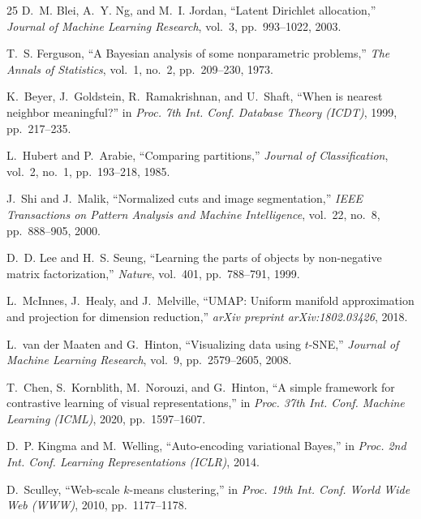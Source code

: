 \documentclass[conference]{IEEEtran}
\begin{document}
\begin{thebibliography}{25}
D.~M. Blei, A.~Y. Ng, and M.~I. Jordan,
``Latent Dirichlet allocation,''
\textit{Journal of Machine Learning Research}, vol.~3, pp.~993--1022, 2003.

T.~S. Ferguson,
``A Bayesian analysis of some nonparametric problems,''
\textit{The Annals of Statistics}, vol.~1, no.~2, pp.~209--230, 1973.

K.~Beyer, J.~Goldstein, R.~Ramakrishnan, and U.~Shaft,
``When is nearest neighbor meaningful?''
in \textit{Proc. 7th Int. Conf. Database Theory (ICDT)}, 1999, pp.~217--235.

L.~Hubert and P.~Arabie,
``Comparing partitions,''
\textit{Journal of Classification}, vol.~2, no.~1, pp.~193--218, 1985.

J.~Shi and J.~Malik,
``Normalized cuts and image segmentation,''
\textit{IEEE Transactions on Pattern Analysis and Machine Intelligence}, vol.~22, no.~8, pp.~888--905, 2000.

D.~D. Lee and H.~S. Seung,
``Learning the parts of objects by non-negative matrix factorization,''
\textit{Nature}, vol.~401, pp.~788--791, 1999.

L.~McInnes, J.~Healy, and J.~Melville,
``UMAP: Uniform manifold approximation and projection for dimension reduction,''
\textit{arXiv preprint arXiv:1802.03426}, 2018.

L.~van der Maaten and G.~Hinton,
``Visualizing data using $t$-SNE,''
\textit{Journal of Machine Learning Research}, vol.~9, pp.~2579--2605, 2008.

T.~Chen, S.~Kornblith, M.~Norouzi, and G.~Hinton,
``A simple framework for contrastive learning of visual representations,''
in \textit{Proc. 37th Int. Conf. Machine Learning (ICML)}, 2020, pp.~1597--1607.

D.~P. Kingma and M.~Welling,
``Auto-encoding variational Bayes,''
in \textit{Proc. 2nd Int. Conf. Learning Representations (ICLR)}, 2014.

D.~Sculley,
``Web-scale $k$-means clustering,''
in \textit{Proc. 19th Int. Conf. World Wide Web (WWW)}, 2010, pp.~1177--1178.

\end{thebibliography}
\end{document}
